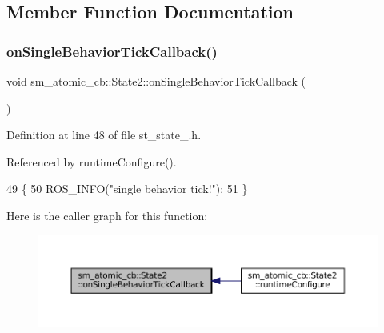 \subsection{Member Function Documentation}
\mbox{\label{structsm__atomic__cb_1_1State2_a4187898b6f6e82dd8f12770856fb8e24}} 
\subsubsection{\texorpdfstring{on\+Single\+Behavior\+Tick\+Callback()}{onSingleBehaviorTickCallback()}}
{\footnotesize\ttfamily void sm\+\_\+atomic\+\_\+cb\+::\+State2\+::on\+Single\+Behavior\+Tick\+Callback (\begin{DoxyParamCaption}{ }\end{DoxyParamCaption})\hspace{0.3cm}{\ttfamily [inline]}}



Definition at line 48 of file st\+\_\+state\+\_.\+h.



Referenced by runtime\+Configure().


\begin{DoxyCode}
49     \{
50         ROS\_INFO(\textcolor{stringliteral}{"single behavior tick!"});
51     \}
\end{DoxyCode}
Here is the caller graph for this function\+:
\nopagebreak
\begin{figure}[H]
\begin{center}
\leavevmode
\includegraphics[width=350pt]{structsm__atomic__cb_1_1State2_a4187898b6f6e82dd8f12770856fb8e24_icgraph}
\end{center}
\end{figure}
\mbox{\label{structsm__atomic__cb_1_1State2_a9367ee51725a8f2e8cdbf7d922cf9108}} 
